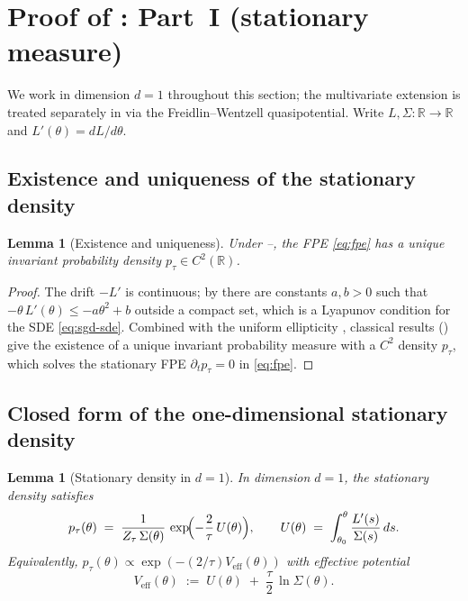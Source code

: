 \documentclass[11pt,a4paper]{article}
\newtheorem{lemma}[theorem]{Lemma}
\theoremstyle{definition}
\theoremstyle{remark}
\newcommand{\R}{\mathbb{R}}
\newcommand{\Veff}{V_{\mathrm{eff}}}
\begin{document}
\section{Proof of : Part~I (stationary measure)}
\label{sec:proof-1}

We work in dimension $d=1$ throughout this section; the multivariate
extension is treated separately in  via the
Freidlin--Wentzell quasipotential.  Write $L,\Sigma:\R\to\R$ and
$L'(\theta) = dL/d\theta$.

\subsection{Existence and uniqueness of the stationary density}

\begin{lemma}[Existence and uniqueness]\label{lem:exist-unique}
   Under --, the FPE \eqref{eq:fpe} has a unique
   invariant probability density $p_\tau\in C^2(\R)$.
\end{lemma}

\begin{proof}
   The drift $-L'$ is continuous; by  there are constants
   $a,b>0$ such that $-\theta\,L'(\theta) \leq -a\theta^2 + b$ outside a
   compact set, which is a Lyapunov condition for the SDE
   \eqref{eq:sgd-sde}.  Combined with the uniform ellipticity
   , classical results (\cite[Theorem~6.16]{Pavliotis2014})
   give the existence of a unique invariant probability measure with a
   $C^2$ density $p_\tau$, which solves the stationary FPE
   $\partial_t p_\tau = 0$ in \eqref{eq:fpe}.
\end{proof}

\subsection{Closed form of the one-dimensional stationary density}

\begin{lemma}[Stationary density in $d=1$]\label{lem:stationary-1d}
   In dimension $d=1$, the stationary density satisfies
   \begin{equation}\label{eq:stationary-1d-restate}
      p_\tau(\theta)
      \;=\; \frac{1}{Z_\tau\,\Sigma(\theta)}\,
            \exp\!\Bigl(-\frac{2}{\tau}\,U(\theta)\Bigr),
      \qquad U(\theta) \;=\; \int_{\theta_0}^\theta
                                       \frac{L'(s)}{\Sigma(s)}\,ds.
   \end{equation}
   Equivalently, $p_\tau(\theta) \propto \exp(-(2/\tau)\Veff(\theta))$ with
   effective potential
   \begin{equation}\label{eq:Veff}
      \Veff(\theta) \;:=\; U(\theta) \;+\; \frac{\tau}{2}\,\ln \Sigma(\theta).
   \end{equation}
\end{lemma}
\end{document}
